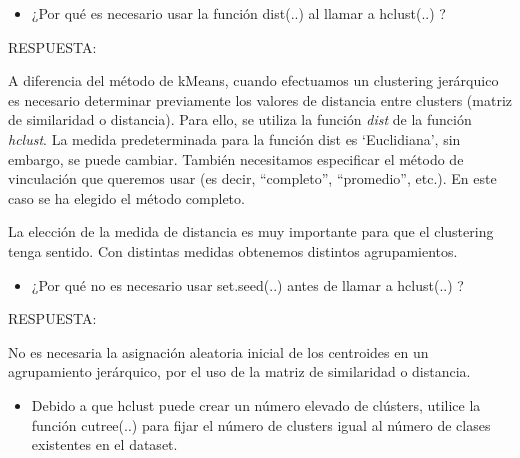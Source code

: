 \documentclass[
]{article}
\newenvironment{Shaded}{\begin{snugshade}}{\end{snugshade}}
\newcommand{\CommentTok}[1]{\textcolor[rgb]{0.56,0.35,0.01}{\textit{#1}}}
\newcommand{\DataTypeTok}[1]{\textcolor[rgb]{0.13,0.29,0.53}{#1}}
\newcommand{\DecValTok}[1]{\textcolor[rgb]{0.00,0.00,0.81}{#1}}
\newcommand{\KeywordTok}[1]{\textcolor[rgb]{0.13,0.29,0.53}{\textbf{#1}}}
\newcommand{\NormalTok}[1]{#1}
\newcommand{\OperatorTok}[1]{\textcolor[rgb]{0.81,0.36,0.00}{\textbf{#1}}}
\newcommand{\StringTok}[1]{\textcolor[rgb]{0.31,0.60,0.02}{#1}}
\providecommand{\tightlist}{%
  \setlength{\itemsep}{0pt}\setlength{\parskip}{0pt}}
\begin{document}
\begin{itemize}
\tightlist
\item
  ¿Por qué es necesario usar la función dist(..) al llamar a hclust(..)
  ?
\end{itemize}

RESPUESTA:

A diferencia del método de kMeans, cuando efectuamos un clustering
jerárquico es necesario determinar previamente los valores de distancia
entre clusters (matriz de similaridad o distancia). Para ello, se
utiliza la función \emph{dist} de la función \emph{hclust}. La medida
predeterminada para la función dist es `Euclidiana', sin embargo, se
puede cambiar. También necesitamos especificar el método de vinculación
que queremos usar (es decir, ``completo'', ``promedio'', etc.). En este
caso se ha elegido el método completo.

La elección de la medida de distancia es muy importante para que el
clustering tenga sentido. Con distintas medidas obtenemos distintos
agrupamientos.

\begin{itemize}
\tightlist
\item
  ¿Por qué no es necesario usar set.seed(..) antes de llamar a
  hclust(..) ?
\end{itemize}

RESPUESTA:

No es necesaria la asignación aleatoria inicial de los centroides en un
agrupamiento jerárquico, por el uso de la matriz de similaridad o
distancia.

\begin{itemize}
\tightlist
\item
  Debido a que hclust puede crear un número elevado de clústers, utilice
  la función cutree(..) para fijar el número de clusters igual al número
  de clases existentes en el dataset.
\end{itemize}

\begin{Shaded}
\end{Shaded}
\end{document}
